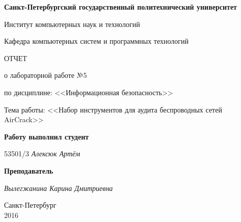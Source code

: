 \begin{titlepage}
\begin{center}

\textbf{Санкт-Петербургский государственный политехнический университет}

\vspace{5mm}
Институт компьютерных наук и технологий

\vspace{5mm}
Кафедра компьютерных систем и программных технологий

\vspace*{\fill}

\huge{ОТЧЕТ}

\Large{о лабораторной работе №5}
\vspace{2mm}

\large{по дисциплине: <<Информационная безопасность>>}

\vspace*{2mm}
\large{Тема работы: <<Набор инструментов для аудита беспроводных сетей AirCrack>>}

\vspace*{\fill}
\end{center}

\begin{large}
\hspace{0.25\linewidth} \textbf{Работу выполнил студент}

\vspace{5mm}
\hspace{0.25\linewidth} 53501/3 \hspace{5mm} \textit{Алексюк Артём}

\vspace{3mm}
\hspace{0.25\linewidth} \textbf{Преподаватель}

\vspace{5mm}
\hspace{0.25\linewidth} \underline{\hspace{2cm} } \hspace{3mm} \textit{Вылегжанина Карина Дмитриевна}
\end{large}

\vspace*{3cm}

\begin{center}
\normalsize Санкт-Петербург\\2016
\end{center}
\end{titlepage}